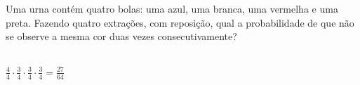 \begin{ex}
	Uma urna contém quatro bolas: uma azul, uma branca, uma vermelha e uma preta. Fazendo quatro extrações, com reposição, qual a probabilidade de que não se observe a mesma cor duas vezes consecutivamente? 
	  \begin{sol}
	    \phantom{A} \\
	    $\frac{4}{4}\cdot\frac{3}{4}\cdot\frac{3}{4}\cdot\frac{3}{4}= \frac{27}{64}$
	  \end{sol}
\end{ex}